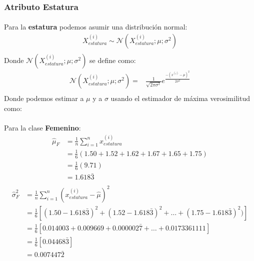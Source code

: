 \documentclass[12pt]{article}
\begin{document}
  \subsubsection{Atributo Estatura}
  \paragraph{}Para la \textbf{estatura} podemos asumir una distribución normal:
  \begin{equation}
  \begin{split}
  X_{estatura}^{(i)}\sim \mathcal{N}(X_{estatura}^{(i)};\mu;\sigma^2)\\
  \end{split}
  \end{equation}
  Donde $\mathcal{N}(X_{estatura}^{(i)};\mu;\sigma^2)$ se define como:\\
  \begin{equation}
  \begin{split}
  \mathcal{N}(X_{estatura}^{(i)};\mu;\sigma^2) =& \frac{1}{\sqrt{2\pi\sigma^2}}e^{\frac{-(x^{(i)} - \mu)^2}{2\sigma^2}}\\
  \end{split}
  \end{equation}
  Donde podemos estimar a $\mu$ y a $\sigma$ usando el estimador de máxima verosimilitud como:
  \paragraph{} Para la clase \textbf{Femenino}:
  \begin{equation}
  \begin{split}
  \hat{\mu}_{F}&=\frac{1}{n}\sum_{i=1}^{n}{x_{estatura}^{(i)}}\\
  &=\frac{1}{6}(1.50 + 1.52 + 1.62 + 1.67 + 1.65 + 1.75)\\
   &=\frac{1}{6}(9.71)\\
   &= 1.618\bar{3}\\
  \end{split}
  \end{equation}
  \begin{equation}
  \begin{split}
  \hat{\sigma}^2_F&=\frac{1}{n}\sum_{i=1}^{n}{(x_{estatura}^{(i)} - \hat{\mu})^2}\\
  &=\frac{1}{6}[(1.50-1.618\bar{3})^2 + (1.52-1.618\bar{3})^2  + \dots + (1.75-1.618\bar{3})^2)]\\
  &=\frac{1}{6}[0.014003 + 0.009669 + 0.000002\bar{7} + \dots + 0.0173361111]\\
  &=\frac{1}{6}[0.04468\bar{3}]\\
  &= 0.007447\bar{2}\\
  \end{split}
  \end{equation}
\end{document}
